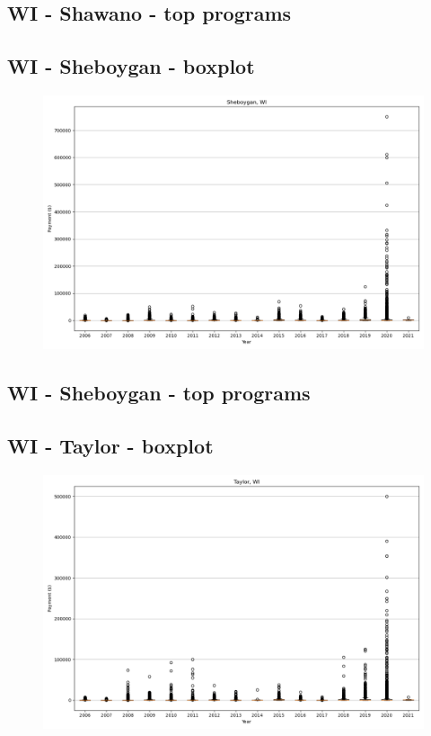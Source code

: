 \subsection*{WI - Shawano - top programs}

\newpage
\subsection*{WI - Sheboygan - boxplot}
\begin{figure}[h]
\centering
\includegraphics[width=7in]{../output/boxplots/counties/Sheboygan-WI_boxplot.png}
\end{figure}


\subsection*{WI - Sheboygan - top programs}

\newpage
\subsection*{WI - Taylor - boxplot}
\begin{figure}[h]
\centering
\includegraphics[width=7in]{../output/boxplots/counties/Taylor-WI_boxplot.png}
\end{figure}


